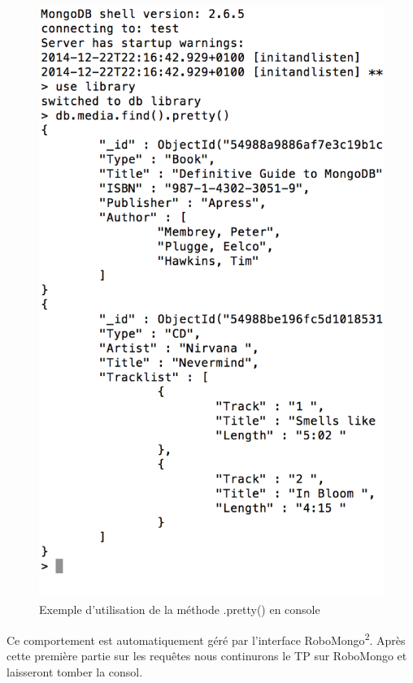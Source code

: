     \begin{figure}[h!]
    \centering
    \includegraphics[scale=0.6]{img/pretty.png}
    \caption{Exemple d'utilisation de la méthode .pretty() en console}
    \end{figure}
    
    \par
        Ce comportement est automatiquement géré par l'interface RoboMongo\textsuperscript{2}. Après cette première partie sur les requêtes nous continurons le TP sur RoboMongo et laisseront tomber la consol.   

